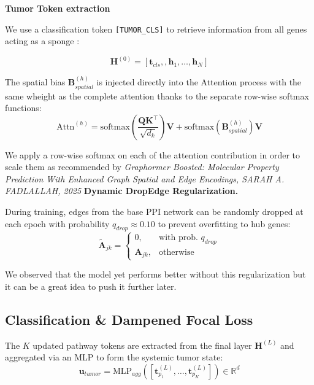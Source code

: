 \documentclass[10pt, twocolumn]{article}
\begin{document}
\noindent

\newpage
\textbf{Tumor Token extraction} 

We use a classification token \texttt{[TUMOR\_CLS]} to retrieve information from all genes acting as a sponge :


\begin{equation}
    \mathbf{H}^{(0)} = [\mathbf{t}_{cls},, \mathbf{h}_1, \dots, \mathbf{h}_N]
\end{equation}

The spatial bias $\mathbf{B}_{spatial}^{(h)}$ is injected directly into the Attention process with the same wheight as the complete attention thanks to the separate row-wise softmax functions:
\begin{equation}
    \text{Attn}^{(h)} = \text{softmax}\left(\frac{\mathbf{Q}\mathbf{K}^\top}{\sqrt{d_k}}\right)\mathbf{V} + \text{softmax}(\mathbf{B}_{spatial}^{(h)})\mathbf{V}
\end{equation}\vspace{0.3cm}

We apply a row-wise softmax on each of the attention contribution in order to scale them as recommended by \textit{Graphormer Boosted: Molecular Property Prediction With Enhanced Graph Spatial and Edge Encodings, SARAH A. FADLALLAH, 2025 }
\noindent
\textbf{Dynamic DropEdge Regularization.} 

During training, edges from the base PPI network can be randomly dropped at each epoch with probability $q_{drop} \approx 0.10$ to prevent overfitting to hub genes:
\begin{equation}
    \tilde{\mathbf{A}}_{jk} = \begin{cases} 
      0, & \text{with prob. } q_{drop} \\
      \mathbf{A}_{jk}, & \text{otherwise}
   \end{cases}
\end{equation}

We observed that the model yet performs better without this regularization but it can be a great idea to push it further later. 

\subsection{Classification \& Dampened Focal Loss}
The $K$ updated pathway tokens are extracted from the final layer $\mathbf{H}^{(L)}$ and aggregated via an MLP to form the systemic tumor state:
\begin{equation}
    \mathbf{u}_{tumor} = \text{MLP}_{agg}\left([\mathbf{t}_{p_1}^{(L)}, \dots, \mathbf{t}_{p_K}^{(L)}]\right) \in \mathbb{R}^d
\end{equation}
\end{document}
